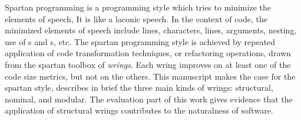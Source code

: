
Spartan programming is a programming style 
which tries to minimize the elements of speech,  
It is like a laconic speech.
In the context of code, the minimized elements of speech include 
lines, characters, lines, arguments, nesting, use of s and
s, etc.  
The spartan programming style is achieved by repeated application
of code transformation techniques, or refactoring operations, drawn 
from the spartan toolbox of \emph{wrings}. 
Each wring improves on at least one of the code size metrics, but
not on the others.
This manuscript makes the case for the spartan style, describes in brief 
the three main kinds of wrings: structural, nominal, and modular. 
The evaluation part of this work gives evidence that the application of
structural wrings contributes to the naturalness of software. 


